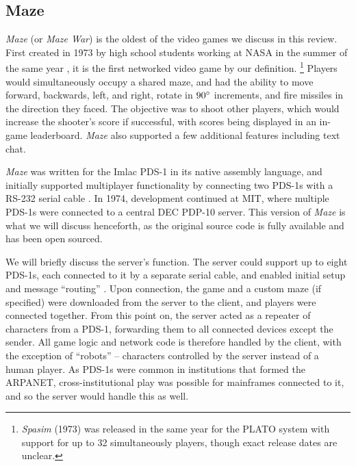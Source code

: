 \label{subsec:maze}

\subsection{Maze}

\textit{Maze} (or \textit{Maze War}) is the oldest of the video games we discuss in this review. First created in 1973 by high school students working at NASA in the summer of the same year \cite{thompson}, it is the first networked video game by our definition.
\footnote{\textit{Spasim} (1973) was released in the same year for the PLATO system with support for up to 32 simultaneously players, though exact release dates are unclear.}
Players would simultaneously occupy a shared maze, and had the ability to move forward, backwards, left, and right, rotate in $90\degree$ increments, and fire missiles in the direction they faced. The objective was to shoot other players, which would increase the shooter's score if successful, with scores being displayed in an in-game leaderboard. \textit{Maze} also supported a few additional features including text chat.

\textit{Maze} was written for the Imlac PDS-1 in its native assembly language, and initially supported multiplayer functionality by connecting two PDS-1s with a RS-232 serial cable \cite{thompson}. In 1974, development continued at MIT, where multiple PDS-1s were connected to a central DEC PDP-10 server. This version of \textit{Maze} is what we will discuss henceforth, as the original source code is fully available and has been open sourced.

%

We will briefly discuss the server's function. The server could support up to eight PDS-1s, each connected to it by a separate serial cable, and enabled initial setup and message ``routing'' \cite{thompson}. Upon connection, the game and a custom maze (if specified) were downloaded from the server to the client, and players were connected together. From this point on, the server acted as a repeater of characters from a PDS-1, forwarding them to all connected devices except the sender. All game logic and network code is therefore handled by the client, with the exception of ``robots'' -- characters controlled by the server instead of a human player.
As PDS-1s were common in institutions that formed the ARPANET, cross-institutional play was possible for mainframes connected to it, and so the server would handle this as well.

%


